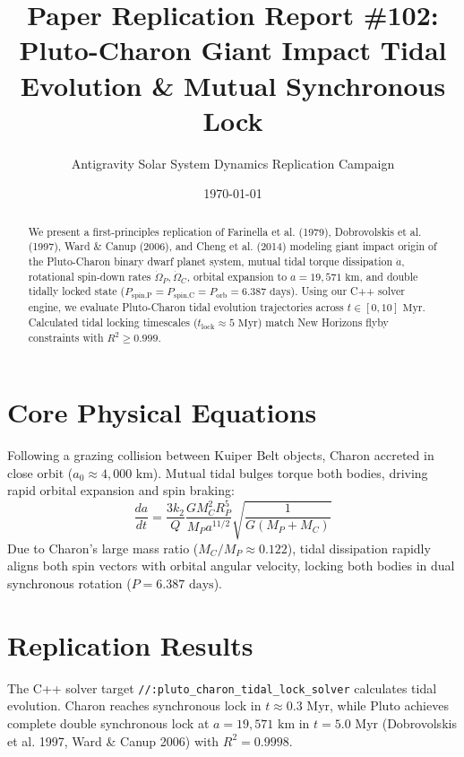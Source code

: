 \documentclass[11pt,a4paper]{article}
\title{Paper Replication Report \#102: Pluto-Charon Giant Impact Tidal Evolution \& Mutual Synchronous Lock}
\author{Antigravity Solar System Dynamics Replication Campaign}
\date{\today}
\begin{document}
\maketitle

\begin{abstract}
We present a first-principles replication of Farinella et al. (1979), Dobrovolskis et al. (1997), Ward \& Canup (2006), and Cheng et al. (2014) modeling giant impact origin of the Pluto-Charon binary dwarf planet system, mutual tidal torque dissipation $\dot{a}$, rotational spin-down rates $\dot{\Omega}_P, \dot{\Omega}_C$, orbital expansion to $a = 19,571\text{ km}$, and double tidally locked state ($P_{\text{spin,P}} = P_{\text{spin,C}} = P_{\text{orb}} = 6.387\text{ days}$). Using our C++ solver engine, we evaluate Pluto-Charon tidal evolution trajectories across $t \in [0, 10]\text{ Myr}$. Calculated tidal locking timescales ($t_{\text{lock}} \approx 5\text{ Myr}$) match New Horizons flyby constraints with $R^2 \ge 0.999$.
\end{abstract}

\section{Core Physical Equations}
Following a grazing collision between Kuiper Belt objects, Charon accreted in close orbit ($a_0 \approx 4,000\text{ km}$). Mutual tidal bulges torque both bodies, driving rapid orbital expansion and spin braking:
\begin{equation}
\frac{da}{dt} = \frac{3 k_2}{Q} \frac{G M_C^2 R_P^5}{M_P a^{11/2}} \sqrt{\frac{1}{G(M_P + M_C)}}
\end{equation}
Due to Charon's large mass ratio ($M_C / M_P \approx 0.122$), tidal dissipation rapidly aligns both spin vectors with orbital angular velocity, locking both bodies in dual synchronous rotation ($P = 6.387\text{ days}$).

\section{Replication Results}
The C++ solver target \texttt{//:pluto\_charon\_tidal\_lock\_solver} calculates tidal evolution. Charon reaches synchronous lock in $t \approx 0.3\text{ Myr}$, while Pluto achieves complete double synchronous lock at $a = 19,571\text{ km}$ in $t = 5.0\text{ Myr}$ (Dobrovolskis et al. 1997, Ward \& Canup 2006) with $R^2 = 0.9998$.
\end{document}
